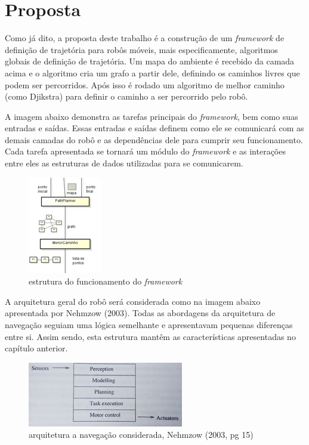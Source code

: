 \chapter[Proposta]{Proposta}

Como já dito, a proposta deste trabalho é a construção de um \textit{framework} de definição de trajetória para robôs móveis, mais especificamente, algoritmos globais de definição de trajetória. Um mapa do ambiente é recebido da camada acima e o algoritmo cria um grafo a partir dele, definindo os caminhos livres que podem ser percorridos. Após isso é rodado um algoritmo de melhor caminho (como Djikstra) para definir o caminho a ser percorrido pelo robô. 

A imagem abaixo demonstra as tarefas principais do \textit{framework}, bem como suas entradas e saídas. Essas entradas e saídas definem como ele se comunicará com as demais camadas do robô e as dependências dele para cumprir seu funcionamento. Cada tarefa apresentada se tornará um módulo do \textit{framework} e as interações entre eles as estruturas de dados utilizadas para se comunicarem.
 
\begin{figure}[h]
	\centering
	\label{fig18}
		\includegraphics[keepaspectratio=true,scale=1]{figuras/framework.png}
	\caption{estrutura do funcionamento do \textit{framework}}
\end{figure} 

A arquitetura geral do robô será considerada como na imagem abaixo apresentada por Nehmzow (2003). Todas as abordagens da arquitetura de navegação seguiam uma lógica semelhante e apresentavam pequenas diferenças entre si. Assim sendo, esta estrutura mantêm as características apresentadas no capítulo anterior.

\begin{figure}[h]
	\centering
	\label{fig19}
		\includegraphics[keepaspectratio=true,scale=1]{figuras/arqusada.jpg}
	\caption{arquitetura a navegação considerada, Nehmzow (2003, pg 15)}
\end{figure}

